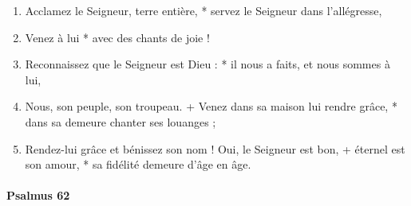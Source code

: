 \documentclass[twoside]{article}
\begin{document}
\begin{paracol}[1]{2}

\begin{enumerate}[wide, itemsep=0mm, labelwidth=!, labelindent=0pt, label=\color{gregoriocolor}\theenumi]

\item Acclamez le Seigneur, terre entière, *
servez le Seigneur dans l'allégresse,

\item Venez à lui *
avec des chants de joie !

\item Reconnaissez que le Seigneur est Dieu : *
il nous a faits, et nous sommes à lui,

\item Nous, son peuple, son troupeau. +
Venez dans sa maison lui rendre grâce, *
dans sa demeure chanter ses louanges ;

\item Rendez-lui grâce et bénissez son nom ! Oui, le Seigneur est bon, +
éternel est son amour, *
sa fidélité demeure d'âge en âge.


\end{enumerate}
\switchcolumn*

\paragraph{Psalmus 62}




\end{paracol}
\end{document}
